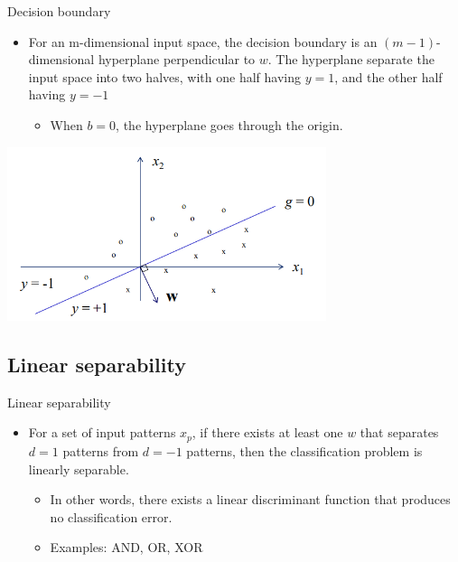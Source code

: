 \documentclass[notes]{beamer}
\providecommand{\tightlist}{%
  \setlength{\itemsep}{0pt}\setlength{\parskip}{0pt}}
\begin{document}
\begin{frame}{Decision boundary}

\begin{itemize}
\tightlist
\item
  For an m-dimensional input space, the decision boundary is an
  \((m-1)\)-dimensional hyperplane perpendicular to \(w\). The
  hyperplane separate the input space into two halves, with one half
  having \(y=1\), and the other half having \(y=-1\)

  \begin{itemize}
  \tightlist
  \item
    When \(b=0\), the hyperplane goes through the origin.
  \end{itemize}
\end{itemize}

\centering 

\includegraphics[width=0.70000\textwidth]{2018-03-08-22-30-37.png} ~

\end{frame}

\subsection{Linear separability}\label{linear-separability}

\begin{frame}{Linear separability}

\begin{itemize}
\tightlist
\item
  For a set of input patterns \(x_p\), if there exists at least one
  \(w\) that separates \(d=1\) patterns from \(d=-1\) patterns, then the
  classification problem is linearly separable.

  \begin{itemize}
  \tightlist
  \item
    In other words, there exists a linear discriminant function that
    produces no classification error.
  \item
    Examples: AND, OR, XOR
  \end{itemize}
\end{itemize}

\end{frame}
\end{document}
